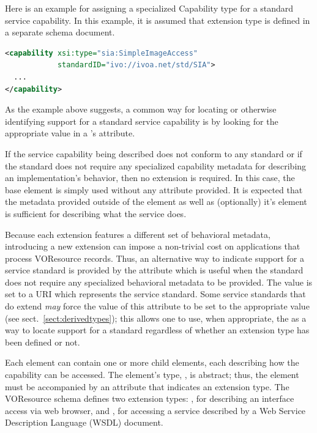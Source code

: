 \documentclass[11pt,a4paper]{ivoa}
\begin{document}
Here is an example for assigning a specialized Capability type for
a standard service capability.  In this example, it is assumed that
 extension type is defined in a separate
schema document.
\begin{lstlisting}[language=XML]
<capability xsi:type="sia:SimpleImageAccess"
            standardID="ivo://ivoa.net/std/SIA">
  ...
</capability>
\end{lstlisting}


As the example above suggests, a common way for locating or otherwise
identifying support for a standard service capability is by looking for
the appropriate value in a 's 
attribute.  


If the service capability being described does not conform to any
standard or if the standard does not require any specialized
capability metadata for describing an implementation's behavior, then
no  extension is required.  In this case,
the base  element is simply used without any
 attribute provided.  It is expected that the
metadata provided outside of the  element as
well as (optionally) it's  element is
sufficient for describing what the service does.  



Because each  extension features a different
set of behavioral metadata, introducing a new
 extension can impose a non-trivial cost on
applications that process VOResource records.  Thus, an alternative
way to indicate support for a service standard is provided by the
 attribute which is useful when the standard
does not require any specialized behavioral metadata to be provided.
The value is set to a URI which represents the service standard.  Some
service standards that do extend 
\emph{may} force the value of this attribute to be set to the
appropriate value (see sect.~\ref{sect:derivedtypes});
this allows one to use, when appropriate, the 
as a way to locate support for a standard regardless of whether an
extension type has been defined or not.   



Each  element can contain one or more child
 elements, each describing how the capability
can be accessed.  The  element's type,
, is abstract; thus, the
 element must be accompanied by an
 attribute that indicates an
 extension type.  The VOResource schema
defines two  extension types:
, for describing an interface access via web
browser, and , for accessing a service
described by a Web Service Description Language (WSDL) document.
\end{document}
